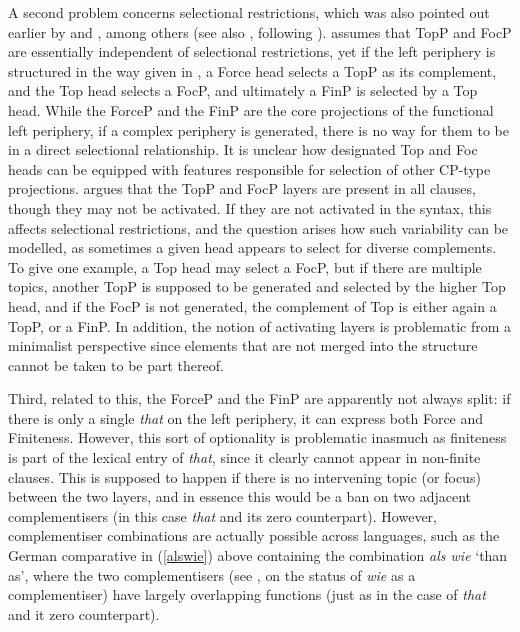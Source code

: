 A second problem concerns selectional restrictions, which was also pointed out earlier by \citet[534--536]{sobin2002} and \citet[231]{abels2012}, among others (see also \citealt{lahne2009}, following \citealt{newmeyer2003}). \citet{rizzi1997, rizzi2004} assumes that TopP and FocP are essentially independent of selectional restrictions, yet if the left periphery is structured in the way given in , a Force head selects a TopP as its complement, and the Top head selects a FocP, and ultimately a FinP is selected by a Top head. While the ForceP and the FinP are the core projections of the functional left periphery, if a complex periphery is generated, there is no way for them to be in a direct selectional relationship. It is unclear how designated Top and Foc heads can be equipped with features responsible for selection of other CP-type projections. \citet{rizzi1997, rizzi2004} argues that the TopP and FocP layers are present in all clauses, though they may not be activated. If they are not activated in the syntax, this affects selectional restrictions, and the question arises how such variability can be modelled, as sometimes a given head appears to select for diverse complements. To give one example, a Top head may select a FocP, but if there are multiple topics, another TopP is supposed to be generated and selected by the higher Top head, and if the FocP is not generated, the complement of Top is either again a TopP, or a FinP. In addition, the notion of activating layers is problematic from a minimalist perspective since elements that are not merged into the structure cannot be taken to be part thereof.

Third, related to this, the ForceP and the FinP are apparently not always split: if there is only a single \textit{that} on the left periphery, it can express both Force and Finiteness. However, this sort of optionality is problematic inasmuch as finiteness is part of the lexical entry of \textit{that}, since it clearly cannot appear in non-finite clauses. This is supposed to happen if there is no intervening topic (or focus) between the two layers, and in essence this would be a ban on two adjacent complementisers (in this case \textit{that} and its zero counterpart). However, complementiser combinations are actually possible across languages, such as the German comparative in (\ref{alswie}) above containing the combination \textit{als wie} `than as', where the two complementisers (see \citealt{jaeger2010, jaeger2018}, \citealt{bacskaiatkari2014dia, bacskaiatkari2014diss} on the status of \textit{wie} as a complementiser) have largely overlapping functions (just as in the case of \textit{that} and it zero counterpart).

